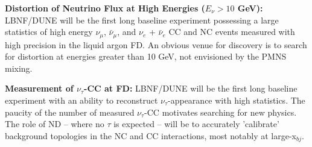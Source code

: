 \vspace{0.25cm} 
\noindent 
{\bf Distortion of Neutrino Flux at High Energies ($E_\nu > 10$ GeV):} 
LBNF/DUNE will be the first long baseline experiment possessing a large 
statistics of high energy $\nu_\mu$,  $\bar \nu_\mu$, and $\nu_e$ + $\bar \nu_e$ CC and NC events 
measured with high precision in the liquid argon FD. An obvious venue for discovery is to 
search for distortion at energies greater than 10 GeV, not envisioned by the 
PMNS mixing. 


\vspace{0.25cm} 
\noindent 
{\bf Measurement of $\nu_\tau$-CC at FD:} 
LBNF/DUNE will be the first long baseline experiment with an ability to 
reconstruct $\nu_\tau$-appearance with high statistics. The paucity of the number of measured 
$\nu_\tau$-CC motivates searching for new physics. 
The role of ND -- where no $\tau$ is expected -- will be to accurately 'calibrate' background topologies 
in the NC and CC interactions, most notably at large-x$_{bj}$. 


